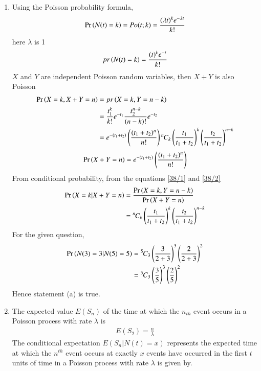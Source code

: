\documentclass[journal,12pt,onecolumn]{IEEEtran}
\theoremstyle{remark}
\begin{document}
\begin{enumerate}[label=(\alph*)]
\item Using the Poisson probability formula,\\
 \begin{align}
 \Pr\left(N(t)=k\right) =Po(t;k) =\frac{(\lambda t)^k e^{-\lambda t}}{k!} 
  \end{align}
 here $\lambda$ is 1 
 \begin{align}
 pr\left(N(t)=k\right) = \frac{(t)^k e^{-t}}{k!}\\
 \end{align}
 $X$ and $Y$ are independent Poisson random variables, then $X+Y$ is also Poisson\\
 \begin{align}
 \Pr\left(X=k,X+Y=n\right)&=pr\left(X=k,Y=n-k\right)\\
 &=\frac{t_1^k}{k!}e^{-t_1}\frac{t_2^{n-k}}{(n-k)!}e^{-t_2}\\
 &=e^{-(t_1+t_2)}\left(\frac{(t_1+t_2)^n}{n!}\right){{}^{n}\mkern-1muC_{k}}\left(\frac{t_1}{t_1+t_2}\right)^k\left(\frac{t_2}{t_1+t_2}\right)^{n-k} \label{38/1}
 \end{align}
 \begin{align}
  \Pr\left(X+Y=n\right)=e^{-(t_1+t_2)}\left(\frac{(t_1+t_2)^n}{n!}\right)\label{38/2}
 \end{align}
  From conditional probability,
  from the equations \eqref{38/1} and \eqref{38/2}
 \begin{align}
 \Pr\left(X=k|X+Y=n\right)&=\frac{\Pr\left(X=k,Y=n-k\right)}{\Pr\left(X+Y=n\right)}\\
 &={{}^{n}\mkern-1muC_{k}}\left(\frac{t_1}{t_1+t_2}\right)^k\left(\frac{t_2}{t_1+t_2}\right)^{n-k}
 \end{align} 
 For the given question,
 \begin{align}
 \Pr\left(N(3)=3|N(5)=5\right)&={{}^{5}\mkern-1muC_{3}}\left(\frac{3}{2+3}\right)^3\left(\frac{2}{2+3}\right)^{2}\\
 &={{}^{5}\mkern-1muC_{3}}\left(\frac{3}{5}\right)^3\left(\frac{2}{5}\right)^{2}
 \end{align}
 Hence statement (a) is true.
\item The expected value $E(S_n)$ of the time at which the $n_{th}$ event occurs in a Poisson process with rate $\lambda$ is\\
\begin{align}
E(S_2)=\frac{n}{\lambda}
\end{align}
The conditional expectation $E(S_n|N(t)=x)$ represents the expected time at which the $n^{th}$ event occurs at exactly $x$ events have occurred in the first $t$ units of time in a Poisson process with rate $\lambda$ is given by.\\

\end{enumerate}
\end{document}
